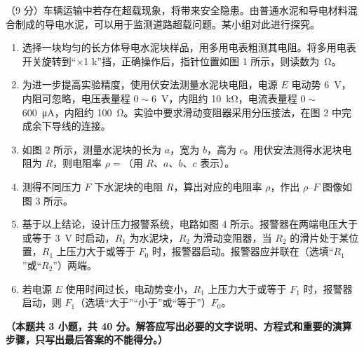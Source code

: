 \begin{question}
（9 分）车辆运输中若存在超载现象，将带来安全隐患。由普通水泥和导电材料混合制成的导电水泥，可以用于监测道路超载问题。某小组对此进行探究。



\begin{enumerate}[leftmargin=2em, label=(\arabic*)]
  \item 选择一块均匀的长方体导电水泥块样品，用多用电表粗测其电阻。将多用电表开关旋转到“$\times$1 k”挡，正确操作后，指针位置如图 1 所示，则读数为\gkblank\ \si{\ohm}。
  \item 为进一步提高实验精度，使用伏安法测量水泥块电阻，电源 $E$ 电动势 \SI{6}{\volt}，内阻可忽略，电压表量程 $0\sim$\SI{6}{\volt}，内阻约 \SI{10}{\kilo\ohm}，电流表量程 $0\sim$\SI{600}{\micro\ampere}，内阻约 \SI{100}{\ohm}。实验中要求滑动变阻器采用分压接法，在图 2 中完成余下导线的连接。
  \item 如图 2 所示，测量水泥块的长为 $a$，宽为 $b$，高为 $c$。用伏安法测得水泥块电阻为 $R$，则电阻率 $\rho=$\gkblank（用 $R$、$a$、$b$、$c$ 表示）。
  \item 测得不同压力 $F$ 下水泥块的电阻 $R$，算出对应的电阻率 $\rho$，作出 $\rho$--$F$ 图像如图 3 所示。
  \item 基于以上结论，设计压力报警系统，电路如图 4 所示。报警器在两端电压大于或等于 \SI{3}{\volt} 时启动，$R_{1}$ 为水泥块，$R_{2}$ 为滑动变阻器，当 $R_{2}$ 的滑片处于某位置，$R_{1}$ 上压力大于或等于 $F_{0}$ 时，报警器启动。报警器应并联在\gkblank（选填“$R_{1}$”或“$R_{2}$”）两端。
  \item 若电源 $E$ 使用时间过长，电动势变小，$R_{1}$ 上压力大于或等于 $F_{1}$ 时，报警器启动，则 $F_{1}$\gkblank（选填“大于”“小于”或“等于”）$F_{0}$。
\end{enumerate}


\end{question}


\textbf{（本题共 3 小题，共 40 分。解答应写出必要的文字说明、方程式和重要的演算步骤，只写出最后答案的不能得分。）}

